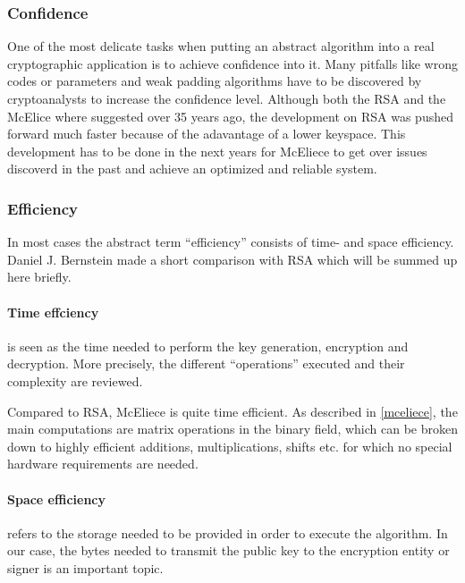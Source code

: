 \subsubsection*{Confidence}
\label{confidence}
One of the most delicate tasks when putting an abstract algorithm into a real cryptographic application is to achieve confidence into it. Many pitfalls like wrong codes or parameters and weak padding algorithms have to be discovered by cryptoanalysts to increase the confidence level. Although both the RSA and the McElice where suggested over 35 years ago, the development on RSA was pushed forward much faster because of the adavantage of a lower keyspace. This development has to be done in the next years for McEliece to get over issues discoverd in the past and achieve an optimized and reliable system.

\subsubsection*{Efficiency}
In most cases the abstract term ``efficiency'' consists of time- and space efficiency. Daniel J. Bernstein made \cite{bernstein2009introduction} a short comparison with  RSA which will be summed up here briefly. 

\paragraph*{Time effciency} is seen as the time needed to perform the key generation, encryption and decryption. More precisely, the different ``operations'' executed and their complexity are reviewed. 

Compared to RSA, McEliece is quite time efficient. As described in \autoref{mceliece}, the main computations are matrix operations in the binary field, which can be broken down to highly efficient additions, multiplications, shifts etc. for which no special hardware requirements are needed\cite{bernstein2009introduction}.

\paragraph*{Space efficiency} \label{space_efficiency} refers to the storage needed to be provided in order to execute the algorithm. In our case, the bytes needed to transmit the public key to the encryption entity or signer is an important topic. \cite{bernstein2009introduction}

